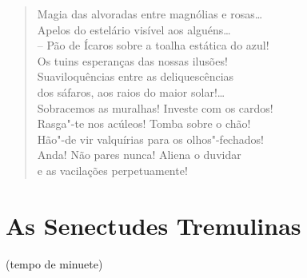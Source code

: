 \begin{verse}
Magia das alvoradas entre magnólias e rosas\ldots{}\\
Apelos do estelário visível aos alguéns\ldots{}\\
-- Pão de Ícaros sobre a toalha estática do azul!\\
Os tuins esperanças das nossas ilusões!\\
Suaviloquências entre as deliquescências\\
dos sáfaros, aos raios do maior solar!\ldots{}\\
Sobracemos as muralhas! Investe com os cardos!\\
Rasga"-te nos acúleos! Tomba sobre o chão!\\
Hão"-de vir valquírias para os olhos"-fechados!\\
Anda! Não pares nunca! Aliena o duvidar\\
e as vacilações perpetuamente!
\end{verse}

\section*{As Senectudes Tremulinas}

\begin{flushright}
(tempo de minuete)
\end{flushright}

